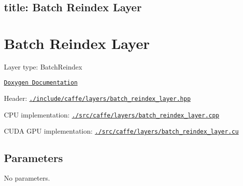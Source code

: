 

 \subsection*{title\+: Batch Reindex Layer }

\section*{Batch Reindex Layer}


\begin{DoxyItemize}
\item Layer type\+: {\ttfamily Batch\+Reindex}
\item \href{http://caffe.berkeleyvision.org/doxygen/classcaffe_1_1BatchReindexLayer.html}{\tt Doxygen Documentation}
\item Header\+: \href{https://github.com/BVLC/caffe/blob/master/include/caffe/layers/batch_reindex_layer.hpp}{\tt {\ttfamily ./include/caffe/layers/batch\+\_\+reindex\+\_\+layer.hpp}}
\item C\+PU implementation\+: \href{https://github.com/BVLC/caffe/blob/master/src/caffe/layers/batch_reindex_layer.cpp}{\tt {\ttfamily ./src/caffe/layers/batch\+\_\+reindex\+\_\+layer.cpp}}
\item C\+U\+DA G\+PU implementation\+: \href{https://github.com/BVLC/caffe/blob/master/src/caffe/layers/batch_reindex_layer.cu}{\tt {\ttfamily ./src/caffe/layers/batch\+\_\+reindex\+\_\+layer.cu}}
\end{DoxyItemize}

\subsection*{Parameters}

No parameters. 